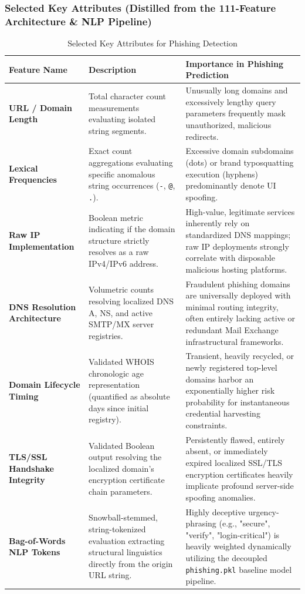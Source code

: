 \subsubsection*{Selected Key Attributes (Distilled from the 111-Feature Architecture \& NLP Pipeline)}

\begin{table}[H]
\centering
\footnotesize
\renewcommand{\arraystretch}{1.5}
\caption{Selected Key Attributes for Phishing Detection}\begin{tabularx}{\textwidth}{|p{3cm}|X|X|}
\hline
\textbf{Feature Name} & \textbf{Description} & \textbf{Importance in Phishing Prediction} \\
\hline
\textbf{URL / Domain Length}  & Total character count measurements evaluating isolated string segments. & Unusually long domains and excessively lengthy query parameters frequently mask unauthorized, malicious redirects. \\
\hline
\textbf{Lexical Frequencies}  & Exact count aggregations evaluating specific anomalous string occurrences (\texttt{-}, \texttt{@}, \texttt{.}). & Excessive domain subdomains (dots) or brand typosquatting execution (hyphens) predominantly denote UI spoofing. \\
\hline
\textbf{Raw IP Implementation} & Boolean metric indicating if the domain structure strictly resolves as a raw IPv4/IPv6 address. & High-value, legitimate services inherently rely on standardized DNS mappings; raw IP deployments strongly correlate with disposable malicious hosting platforms. \\
\hline
\textbf{DNS Resolution Architecture}  & Volumetric counts resolving localized DNS A, NS, and active SMTP/MX server registries. & Fraudulent phishing domains are universally deployed with minimal routing integrity, often entirely lacking active or redundant Mail Exchange infrastructural frameworks. \\
\hline
\textbf{Domain Lifecycle Timing}  & Validated WHOIS chronologic age representation (quantified as absolute days since initial registry). & Transient, heavily recycled, or newly registered top-level domains harbor an exponentially higher risk probability for instantaneous credential harvesting constraints. \\
\hline
\textbf{TLS/SSL Handshake Integrity} & Validated Boolean output resolving the localized domain's encryption certificate chain parameters. & Persistently flawed, entirely absent, or immediately expired localized SSL/TLS encryption certificates heavily implicate profound server-side spoofing anomalies. \\
\hline
\textbf{Bag-of-Words NLP Tokens} & Snowball-stemmed, string-tokenized evaluation extracting structural linguistics directly from the origin URL string. & Highly deceptive urgency-phrasing (e.g., "secure", "verify", "login-critical") is heavily weighted dynamically utilizing the decoupled \texttt{phishing.pkl} baseline model pipeline. \\
\hline
\end{tabularx}
\end{table}


